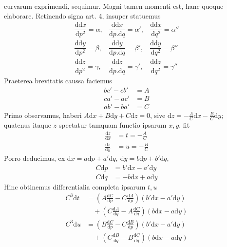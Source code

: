 %
curvarum exprimendi, sequimur. Magni tamen momenti est, hanc quoque elaborare. Retinendo signa art. 4, insuper statuemus
\[
\begin{array}{lll}
\dfrac{\mathrm{d}\mathrm{d}x}{\mathrm{d}p^2}=\alpha,&\dfrac{\mathrm{d}\mathrm{d}x}{\mathrm{d}p\mathord{.}\mathrm{d}q}=\alpha',&\dfrac{\mathrm{d}\mathrm{d}x}{\mathrm{d}q^2}=\alpha''\\[6pt]
\dfrac{\mathrm{d}\mathrm{d}y}{\mathrm{d}p^2}=\beta,&\dfrac{\mathrm{d}\mathrm{d}y}{\mathrm{d}p\mathord{.}\mathrm{d}q}=\beta',&\dfrac{\mathrm{d}\mathrm{d}y}{\mathrm{d}q^2}=\beta''\\[6pt]
\dfrac{\mathrm{d}\mathrm{d}z}{\mathrm{d}p^2}=\gamma,&\dfrac{\mathrm{d}\mathrm{d}z}{\mathrm{d}p\mathord{.}\mathrm{d}q}=\gamma',&\dfrac{\mathrm{d}\mathrm{d}z}{\mathrm{d}q^2}=\gamma''
\end{array}
\]
Praeterea brevitatis caussa faciemus
\[
\begin{aligned}
bc'-cb'&=A\\
ca'-ac'&=B\\
ab'-ba'&=C
\end{aligned}
\]
Primo observamus, haberi \(A\mathrm{d}x+B\mathrm{d}y+C\mathrm{d}z=0\), sive \(\mathrm{d}z=-\frac{A}{C}\mathrm{d}x-\frac{B}{C}\mathrm{d}y\); quatenus itaque \(z\) spectatur tamquam functio ipsarum \(x,y\), fit
\[
\begin{aligned}
\frac{\mathrm{d}z}{\mathrm{d}x}&=t=-\frac{A}{C}\\
\frac{\mathrm{d}z}{\mathrm{d}y}&=u=-\frac{B}{C}
\end{aligned}
\]
Porro deducimus, ex \(\mathrm{d}x=a\mathrm{d}p+a'\mathrm{d}q,\ \mathrm{d}y=b\mathrm{d}p+b'\mathrm{d}q\),
\[
\begin{aligned}
C\mathrm{d}p&=b'\mathrm{d}x-a'\mathrm{d}y\\
C\mathrm{d}q&=-b\mathrm{d}x+a\mathrm{d}y
\end{aligned}
\]
Hinc obtinemus differentialia completa ipsarum \(t,u\)
\[
\begin{aligned}
C^3\mathrm{d}t&=(A\tfrac{\mathrm{d}C}{\mathrm{d}p}-C\tfrac{\mathrm{d}A}{\mathrm{d}p})(b'\mathrm{d}x-a'\mathrm{d}y)\\
&\quad +(C\tfrac{\mathrm{d}A}{\mathrm{d}q}-A\tfrac{\mathrm{d}C}{\mathrm{d}q})(b\mathrm{d}x-a\mathrm{d}y)\\
C^3\mathrm{d}u&=(B\tfrac{\mathrm{d}C}{\mathrm{d}p}-C\tfrac{\mathrm{d}B}{\mathrm{d}p})(b'\mathrm{d}x-a'\mathrm{d}y)\\
&\quad +(C\tfrac{\mathrm{d}B}{\mathrm{d}q}-B\tfrac{\mathrm{d}C}{\mathrm{d}q})(b\mathrm{d}x-a\mathrm{d}y)
\end{aligned}
\]

